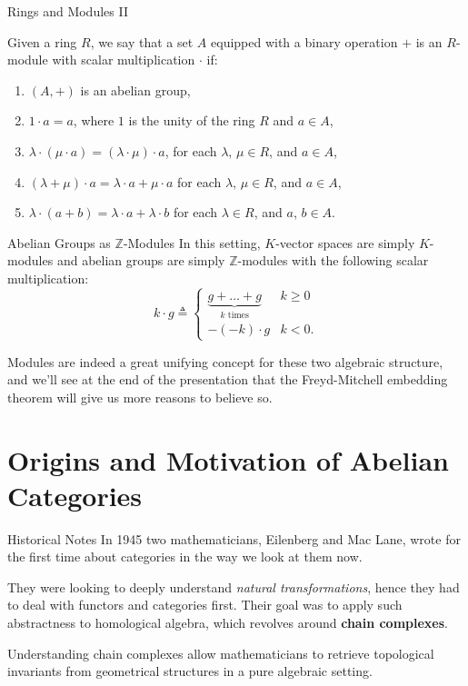 \documentclass{beamer}
\newcommand{\ZZ}{\mathbb{Z}}
\begin{document}
\begin{frame}{Rings and Modules II}
    \begin{definition}[$R$-module]
        Given a ring $R$, we say that a set $A$ equipped with a binary operation $+$ is an $R$-module with
        scalar multiplication $\cdot$ if:
        \begin{enumerate}
            \item $(A, +)$ is an abelian group,
            \item $1 \cdot a = a$, where $1$ is the unity of the ring $R$ and $a \in A$,
            \item $\lambda \cdot (\mu \cdot a) = (\lambda \cdot \mu) \cdot a$, for each $\lambda$, $\mu \in R$, and $a \in A$, 
            \item $(\lambda + \mu) \cdot a = \lambda \cdot a + \mu \cdot a$ for each $\lambda$, $\mu \in R$, and $a \in A$,
            \item $\lambda \cdot (a + b) = \lambda \cdot a + \lambda \cdot b$ for each $\lambda \in R$, and $a$, $b \in A$.
        \end{enumerate}
    \end{definition}
\end{frame}

\begin{frame}{Abelian Groups as \texorpdfstring{$\ZZ$}{ℤ}-Modules}
    In this setting, $K$-vector spaces are simply $K$-modules and abelian groups
    are simply $\ZZ$-modules with the following scalar multiplication:
    \[
        k \cdot g \triangleq \begin{cases}
            \underbrace{g + \ldots + g}_{k \text{ times}} & k \geq 0 \\
            -(-k) \cdot g & k < 0.
        \end{cases}
    \] \smallskip

    Modules are indeed a great unifying concept for these two algebraic structure, and we'll see
    at the end of the presentation that the Freyd-Mitchell embedding theorem will
    give us more reasons to believe so.
\end{frame}


\section{Origins and Motivation of Abelian Categories}

\begin{frame}{Historical Notes}
    In 1945 two mathematicians, Eilenberg and Mac Lane, wrote for the
    first time about categories in the way we look at them now. \medskip
    
    They were looking to
    deeply understand \textit{natural transformations}, hence they had
    to deal with functors and categories first. Their goal was to
    apply such abstractness to homological algebra, which revolves
    around \textbf{chain complexes}. \medskip

    Understanding chain complexes allow mathematicians to retrieve
    topological invariants from geometrical structures in a pure
    algebraic setting.
\end{frame}
\end{document}
